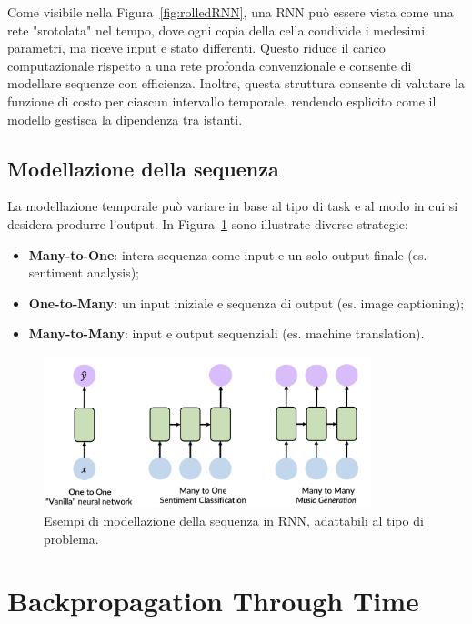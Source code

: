 Come visibile nella Figura~\ref{fig:rolledRNN}, una RNN può essere vista come una rete "srotolata" nel tempo, dove ogni copia della cella condivide i medesimi parametri, ma riceve input e stato differenti. Questo riduce il carico computazionale rispetto a una rete profonda convenzionale e consente di modellare sequenze con efficienza. Inoltre, questa struttura consente di valutare la funzione di costo per ciascun intervallo temporale, rendendo esplicito come il modello gestisca la dipendenza tra istanti.

\subsection{Modellazione della sequenza}

La modellazione temporale può variare in base al tipo di task e al modo in cui si desidera produrre l'output. In Figura~\ref{fig:seqMod} sono illustrate diverse strategie:

\begin{itemize}
    \item \textbf{Many-to-One}: intera sequenza come input e un solo output finale (es. sentiment analysis);
    \item \textbf{One-to-Many}: un input iniziale e sequenza di output (es. image captioning);
    \item \textbf{Many-to-Many}: input e output sequenziali (es. machine translation).
\end{itemize}

\begin{figure}
    \centering
    \includegraphics[width=0.85\textwidth]{figure/SequenceModeling.png}
    \caption{Esempi di modellazione della sequenza in RNN, adattabili al tipo di problema.}
    \label{fig:seqMod}
\end{figure}

\section{Backpropagation Through Time}

